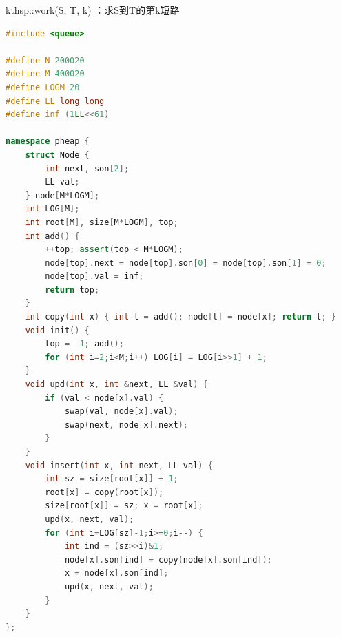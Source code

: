 \documentclass{article}
\begin{document}
\begin{CJK}{UTF8}{song}
kthsp::work(S, T, k) ：求S到T的第k短路
\begin{lstlisting}[language=C++]
#include <queue>
 
#define N 200020
#define M 400020
#define LOGM 20
#define LL long long
#define inf (1LL<<61)

namespace pheap {
	struct Node {
		int next, son[2];
		LL val;
	} node[M*LOGM];
	int LOG[M];
	int root[M], size[M*LOGM], top;
	int add() {
		++top; assert(top < M*LOGM);
		node[top].next = node[top].son[0] = node[top].son[1] = 0;
		node[top].val = inf;
		return top;
	}
	int copy(int x) { int t = add(); node[t] = node[x]; return t; }
	void init() {
		top = -1; add();
		for (int i=2;i<M;i++) LOG[i] = LOG[i>>1] + 1;
	}
	void upd(int x, int &next, LL &val) {
		if (val < node[x].val) {
			swap(val, node[x].val);
			swap(next, node[x].next);
		}
	}
	void insert(int x, int next, LL val) {
		int sz = size[root[x]] + 1;
		root[x] = copy(root[x]);
		size[root[x]] = sz; x = root[x];
		upd(x, next, val);
		for (int i=LOG[sz]-1;i>=0;i--) {
			int ind = (sz>>i)&1;
			node[x].son[ind] = copy(node[x].son[ind]);
			x = node[x].son[ind];
			upd(x, next, val);
		}
	}
};
 

\end{lstlisting}
\end{CJK}
\end{document}
